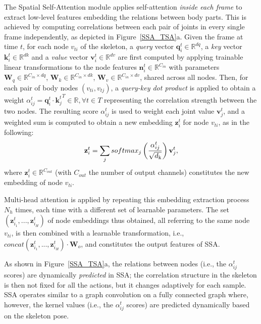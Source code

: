 \documentclass[times,twocolumn,final,authoryear]{elsarticle}
\begin{document}
The Spatial Self-Attention module applies self-attention \textit{inside each frame} to extract low-level features embedding the relations between body parts. This is achieved by computing correlations between each pair of joints in every single frame independently, as depicted in Figure~\ref{SSA_TSA}a. 
Given the frame at time $t$, for each node $v_{ti}$ of the skeleton, a \textit{query} vector  $\mathbf{q}^t_i \in \mathbb{R}^{dq}$, a \textit{key} vector $\mathbf{k}^t_i \in \mathbb{R}^{dk}$ and a \textit{value} vector $\mathbf{v}^t_i \in \mathbb{R}^{dv}$ are first computed by applying trainable linear transformations to the node features $\mathbf{n}_i^t \in \mathbb{R}^{C_{in}}$ with parameters $\mathbf{W}_q \in \mathbb{R}^{C_{in} \times dq}$, $\mathbf{W}_k \in \mathbb{R}^{C_{in} \times dk}$, $\mathbf{W}_v \in \mathbb{R}^{C_{in} \times dv}$, shared across all nodes. Then, for each pair of body nodes $(v_{ti}, v_{tj})$, a \textit{query-key dot product} is applied to obtain a weight $\alpha^t_{ij}={\mathbf{q}}^t_{i} \cdot {{\mathbf{k}}^t_{j}}^T \in \mathbb{R}, \forall t \in T$ representing the correlation strength between the two nodes. The resulting score $\alpha^t_{ij}$ is used to weight each joint value $\textbf{v}^t_j$, and a weighted sum is computed to obtain a new embedding $\mathbf{z}^t_i$ for node $v_{ti}$, as in the following:
\begin{equation}\label{eq5}
{\mathbf{z}}^t_i=\sum_j{softmax_j \left(\frac{\alpha^t_{ij}}{\sqrt{d\textsubscript{k}}} \right)  {\mathbf{v}}^t_j} ,
\end{equation}
where ${\mathbf{z}^t_i} \in \mathbb{R}^{C_{out}}$ (with $C_{out}$ the number of output channels) constitutes the new embedding of node $v_{ti}$.


Multi-head attention is applied by repeating this embedding extraction process $N_h$ times, each time with a different set of learnable parameters. The set $(\mathbf{z}^t_{i_1}, ..., \mathbf{z}^t_{i_H})$ of node embeddings thus obtained, all referring to the same node $v_{ti}$, is then combined with a learnable transformation, i.e., $concat(\mathbf{z}^t_{i_1},...,\mathbf{z}^t_{i_H})\cdot\mathbf{W}_o$, and constitutes the output features of SSA.

As shown in Figure~\ref{SSA_TSA}a, the relations between nodes (i.e., the $\alpha_{ij}^t$ scores) are dynamically \textit{predicted} in SSA; the correlation structure in the skeleton is then not fixed for all the actions, but it changes adaptively for each sample. SSA operates similar to a graph convolution on a fully connected graph where, however, the kernel values (i.e., the $\alpha_{ij}^t$ scores) are predicted dynamically based on the skeleton pose.
\end{document}

